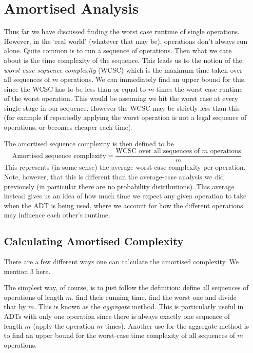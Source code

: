 \section{Amortised Analysis}
Thus far we have discussed finding the worst case runtime of single operations. However, in the `real world' (whatever that may be), operations don't always run alone. Quite common is to run a sequence of operations. Then what we care about is the time complexity of the sequence. This leads us to the notion of the \textit{worst-case sequence complexity} (WCSC) which is the maximum time taken over all sequences of $m$ operations. We can immediately find an upper bound for this, since the WCSC has to be less than or equal to $m$ times the worst-case runtime of the worst operation. This would be assuming we hit the worst case at every single stage in our sequence. However the WCSC may be strictly less than this (for example if repeatedly applying the worst operation is not a legal sequence of operations, or becomes cheaper each time).

The amortised sequence complexity is then defined to be
$$ \text{Amortised sequence complexity} = \frac{\text{WCSC over all sequences of $m$ operations}}{m} $$
This represents (in some sense) the average worst-case complexity per operation. Note, however, that this is different than the average-case analysis we did previously (in particular there are no probability distributions). This average instead gives us an idea of how much time we expect any given operation to take when the ADT is being used, where we account for how the different operations may influence each other's runtime.

\subsection{Calculating Amortised Complexity}
There are a few different ways one can calculate the amortised complexity. We mention 3 here.

The simplest way, of course, is to just follow the definition: define all sequences of operations of length $m$, find their running time, find the worst one and divide that by $m$. This is known as the \textit{aggregate} method. This is particularly useful in ADTs with only one operation since there is always exactly one sequence of length $m$ (apply the operation $m$ times). Another use for the aggregate method is to find an upper bound for the worst-case time complexity of all sequences of $m$ operations.

